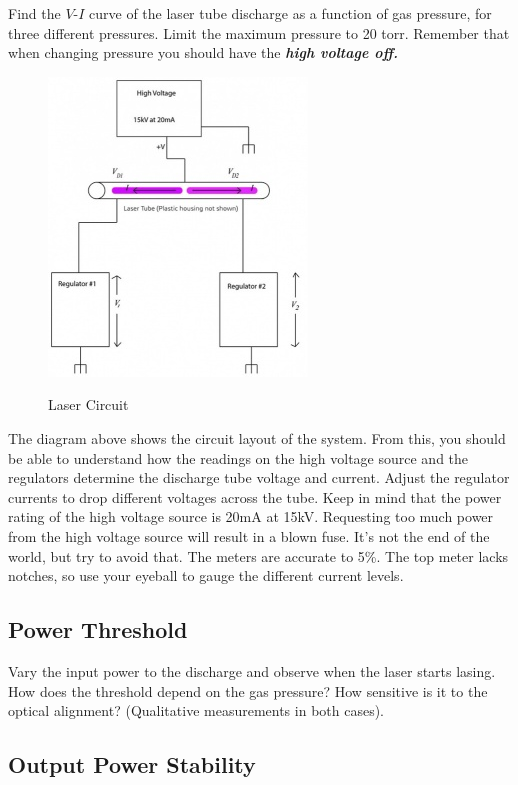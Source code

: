 \documentclass{../lab}
\begin{document}
Find the $V$-$I$ curve of the laser tube discharge as a function of gas pressure, for three different pressures. Limit the maximum pressure to 20 torr. Remember that when changing pressure you should have the \emph{\textbf{high voltage off.}}

\begin{figure}[h]
\centering
    \href{http://experimentationlab.berkeley.edu/sites/default/files/upimages/2_lasercircuitpic_small.jpg}{\includegraphics[width=0.5\linewidth]{images/2_lasercircuitpic_small.jpg}}
    \caption{Laser Circuit}
\end{figure}

The diagram above shows the circuit layout of the system. From this, you should be able to understand how the readings on the high voltage source and the regulators determine the discharge tube voltage and current. Adjust the regulator currents to drop different voltages across the tube. Keep in mind that the power rating of the high voltage source is 20mA at 15kV. Requesting too much power from the high voltage source will result in a blown fuse. It's not the end of the world, but try to avoid that. The meters are accurate to 5\%. The top meter lacks notches, so use your eyeball to gauge the different current levels.

\subsection{Power Threshold}

Vary the input power to the discharge and observe when the laser starts lasing. How does the threshold depend on the gas pressure? How sensitive is it to the optical alignment? (Qualitative measurements in both cases).

\subsection{Output Power Stability}
\end{document}
